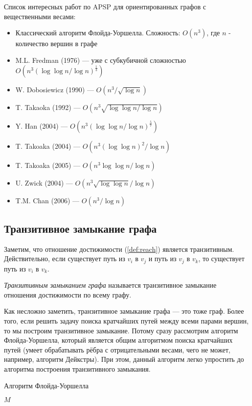 Список интересных работ по APSP для ориентированных графов с вещественными весами:
\begin{itemize}
    \item Классический алгоритм Флойда-Уоршелла. Сложность: $O(n^3)$, где $n$ - количество вершин в графе
    \item M.L. Fredman (1976) --- уже с субкубичной сложностью $O(n^3(\log \log n / \log n)^\frac{1}{3})$
    \item W. Dobosiewicz (1990) --- $O(n^3 / \sqrt{\log n})$
    \item T. Takaoka (1992) --- $O(n^3 \sqrt{\log \log n / \log n})$
    \item Y. Han (2004) --- $O(n^3 (\log \log n / \log n)^\frac{5}{7})$
    \item T. Takoaka (2004) --- $O(n^3 (\log \log n)^2 / \log n)$
    \item T. Takoaka (2005) --- $O(n^3 \log \log n / \log n)$
    \item U. Zwick (2004) --- $O(n^3 \sqrt{\log \log n} / \log n)$
    \item T.M. Chan (2006) --- $O(n^3 / \log n)$ \cite{Chan2008}
\end{itemize}

\subsection{Транзитивное замыкание графа}

Заметим, что отношение достижимости (\ref{def:reach}) является транзитивным.
Действительно, если существует путь из $v_i$ в $v_j$ и путь из $v_j$ в $v_k$, то существует путь из $v_i$ в $v_k$.

\begin{definition}
  \textit{Транзитивным замыканием графа} называется транзитивное замыкание отношения достижимости по всему графу.
\end{definition}

Как несложно заметить, транзитивное замыкание графа --- это тоже граф.
Более того, если решить задачу поиска кратчайших путей между всеми парами вершин, то мы построим транзитивное замыкание.
Потому сразу рассмотрим алгоритм Флойда-Уоршелла, который является общим алгоритмом поиска кратчайших путей (умеет обрабатывать рёбра с отрицательными весами, чего не может, например, алгоритм Дейкстры).
При этом, данный алгоритм легко упростить до алгоритма построения транзитивного замыкания.

\begin{algorithm}
\begin{algorithmic}[1]
\caption{Алгоритм Флойда-Уоршелла}
\label{lst:algoFloydWarxhall}
        \EndFor
      \EndFor
    \EndFor
\State \Return $M$
\EndFunction
\end{algorithmic}
\end{algorithm}


